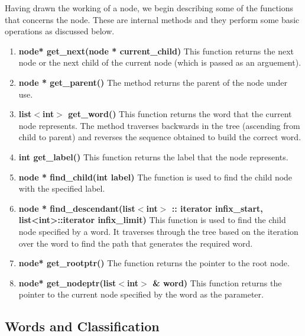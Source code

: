 	Having drawn the working of a node, we begin describing some of the functions that concerns the node. These are internal methods and they perform some basic operations as discussed below.
\begin{enumerate}
\item \textbf{node* get\_next(node * current\_child)} \hfill \vskip 1pt
	This function returns the next node or the next child of the current node (which is passed as an arguement). 
	
\item \textbf{node * get\_parent()} \hfill \vskip 1pt
	The method returns the parent of the node under use.

\item \textbf{list$<$int$>$ get\_word()} \hfill \vskip 1pt
	This function returns the word that the current node represents. The method traverses backwards in the tree (ascending from child to parent) and reverses the sequence obtained to build the correct word.
	
\item \textbf{int get\_label()} \hfill \vskip 1pt
	This function returns the label that the node represents.
	
\item \textbf{node * find\_child(int label)} \hfill \vskip 1pt
	The function is used to find the child node with the specified label.
	
\item \textbf{node * find\_descendant(list$<$int$>$ :: iterator infix\_start, list<int>::iterator infix\_limit)} \hfill \vskip 1pt
	This function is used to find the child node specified by a word. It traverses through the tree based on the iteration over the word to find the path that generates the required word.
	
\item \textbf{node* get\_rootptr()} \hfill \vskip 1pt
	The function returns the pointer to the root node.
	
\item \textbf{node* get\_nodeptr(list$<$int$>$ \& word)} \hfill \vskip 1pt
	This function returns the pointer to the current node specified by the word as the parameter.
	
\end{enumerate}

\subsection{Words and Classification}

